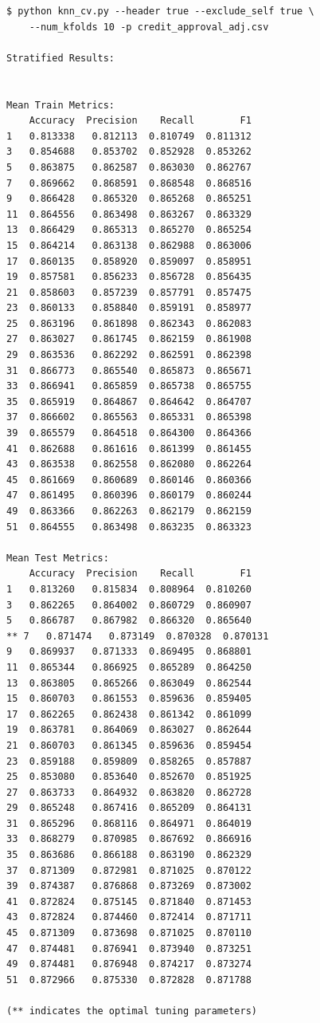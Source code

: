 \begin{verbatim}
$ python knn_cv.py --header true --exclude_self true \
    --num_kfolds 10 -p credit_approval_adj.csv

Stratified Results:


Mean Train Metrics: 
    Accuracy  Precision    Recall        F1
1   0.813338   0.812113  0.810749  0.811312
3   0.854688   0.853702  0.852928  0.853262
5   0.863875   0.862587  0.863030  0.862767
7   0.869662   0.868591  0.868548  0.868516
9   0.866428   0.865320  0.865268  0.865251
11  0.864556   0.863498  0.863267  0.863329
13  0.866429   0.865313  0.865270  0.865254
15  0.864214   0.863138  0.862988  0.863006
17  0.860135   0.858920  0.859097  0.858951
19  0.857581   0.856233  0.856728  0.856435
21  0.858603   0.857239  0.857791  0.857475
23  0.860133   0.858840  0.859191  0.858977
25  0.863196   0.861898  0.862343  0.862083
27  0.863027   0.861745  0.862159  0.861908
29  0.863536   0.862292  0.862591  0.862398
31  0.866773   0.865540  0.865873  0.865671
33  0.866941   0.865859  0.865738  0.865755
35  0.865919   0.864867  0.864642  0.864707
37  0.866602   0.865563  0.865331  0.865398
39  0.865579   0.864518  0.864300  0.864366
41  0.862688   0.861616  0.861399  0.861455
43  0.863538   0.862558  0.862080  0.862264
45  0.861669   0.860689  0.860146  0.860366
47  0.861495   0.860396  0.860179  0.860244
49  0.863366   0.862263  0.862179  0.862159
51  0.864555   0.863498  0.863235  0.863323

Mean Test Metrics: 
    Accuracy  Precision    Recall        F1
1   0.813260   0.815834  0.808964  0.810260
3   0.862265   0.864002  0.860729  0.860907
5   0.866787   0.867982  0.866320  0.865640
** 7   0.871474   0.873149  0.870328  0.870131
9   0.869937   0.871333  0.869495  0.868801
11  0.865344   0.866925  0.865289  0.864250
13  0.863805   0.865266  0.863049  0.862544
15  0.860703   0.861553  0.859636  0.859405
17  0.862265   0.862438  0.861342  0.861099
19  0.863781   0.864069  0.863027  0.862644
21  0.860703   0.861345  0.859636  0.859454
23  0.859188   0.859809  0.858265  0.857887
25  0.853080   0.853640  0.852670  0.851925
27  0.863733   0.864932  0.863820  0.862728
29  0.865248   0.867416  0.865209  0.864131
31  0.865296   0.868116  0.864971  0.864019
33  0.868279   0.870985  0.867692  0.866916
35  0.863686   0.866188  0.863190  0.862329
37  0.871309   0.872981  0.871025  0.870122
39  0.874387   0.876868  0.873269  0.873002
41  0.872824   0.875145  0.871840  0.871453
43  0.872824   0.874460  0.872414  0.871711
45  0.871309   0.873698  0.871025  0.870110
47  0.874481   0.876941  0.873940  0.873251
49  0.874481   0.876948  0.874217  0.873274
51  0.872966   0.875330  0.872828  0.871788

(** indicates the optimal tuning parameters)

\end{verbatim}

